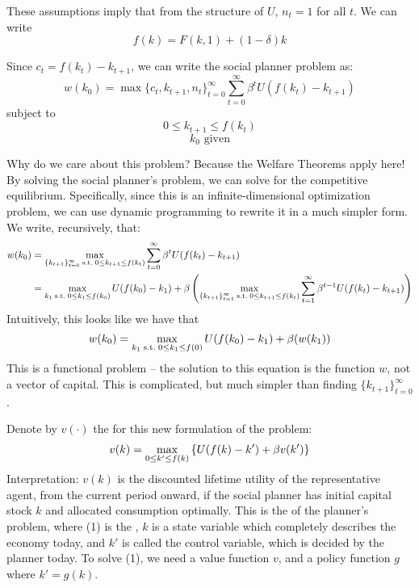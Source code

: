 \documentclass[10pt]{article}
\begin{document}
These assumptions imply that from the structure of $U$, $n_t = 1$ for all $t$. We can write
\[
f(k) = F(k,1) + (1-\delta)k
\]

Since $c_t = f(k_t) - k_{t+1}$, we can write the social planner problem as:
\[
w(k_0) = \max{\{c_t,k_{t+1},n_t\}_{t=0}^\infty}\sum_{t=0}^\infty \beta^t U(f(k_t) - k_{t+1})
\]
subject to
\[
0 \le k_{t+1} \le f(k_t)
\]
\[
k_0 \text{ given}
\]

Why do we care about this problem? Because the Welfare Theorems apply here! By solving the social planner's problem, we can solve for the competitive equilibrium. Specifically, since this is an infinite-dimensional optimization problem, we can use dynamic programming to rewrite it in a much simpler form. We write, recursively, that:
\begin{align*}
	w(k_0) &= \max_{\{k_{t+1}\}_{t=0}^\infty \;\text{s.t.}\; 0 \le k_{t+1} \le f(k_t)} \sum_{t=0}^\infty \beta^t U(f(k_t) - k_{t+1}) \\
	&= \max_{k_{1} \;\text{s.t.}\; 0 \le k_{1} \le f(k_0)} U(f(k_0) - k_1) + \beta \left( \max_{\{k_{t+1}\}_{t=1}^\infty \;\text{s.t.}\; 0 \le k_{t+1} \le f(k_t)} \sum_{t=1}^\infty \beta^{t-1} U(f(k_t) - k_{t+1}) \right)
\end{align*}
Intuitively, this looks like we have that
\[
w(k_0) = \max_{k_1 \;\text{s.t.}\; 0 \le k_{1} \le f(0)} U(f(k_0) - k_1) + \beta( w(k_1))
\]
This is a functional problem -- the solution to this equation is the function $w$, not a vector of capital. This is complicated, but much simpler than finding $\{k_{t+1}\}_{t=0}^\infty$.
\begin{definition}
	Denote by $v(\cdot)$ the  for this new formulation of the problem:
	\begin{equation}
		v(k) = \max_{0 \le k' \le f(k)} \left\{ U(f(k) - k') + \beta v(k') \right\}
	\end{equation}
	Interpretation: $v(k)$ is the discounted lifetime utility of the representative agent, from the current period onward, if the social planner has initial capital stock $k$ and allocated consumption optimally. This is the  of the planner's problem, where (1) is the , $k$ is a state variable which completely describes the economy today, and $k'$ is called the control variable, which is decided by the planner today. To solve (1), we need a value function $v$, and a policy function $g$ where $k' = g(k)$.
\end{definition}
\end{document}
